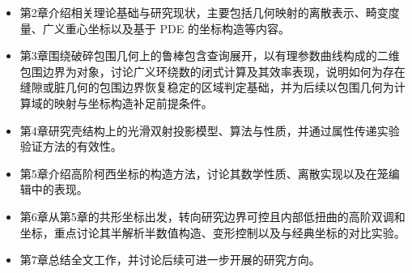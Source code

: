 \begin{itemize}
  \item 第2章介绍相关理论基础与研究现状，主要包括几何映射的离散表示、畸变度量、广义重心坐标以及基于 PDE 的坐标构造等内容。
  \item 第3章围绕破碎包围几何上的鲁棒包含查询展开，以有理参数曲线构成的二维包围边界为对象，讨论广义环绕数的闭式计算及其效率表现，说明如何为存在缝隙或脏几何的包围边界恢复稳定的区域判定基础，并为后续以包围几何为计算域的映射与坐标构造补足前提条件。
  \item 第4章研究壳结构上的光滑双射投影模型、算法与性质，并通过属性传递实验验证方法的有效性。
  \item 第5章介绍高阶柯西坐标的构造方法，讨论其数学性质、离散实现以及在笼编辑中的表现。
  \item 第6章从第5章的共形坐标出发，转向研究边界可控且内部低扭曲的高阶双调和坐标，重点讨论其半解析半数值构造、变形控制以及与经典坐标的对比实验。
  \item 第7章总结全文工作，并讨论后续可进一步开展的研究方向。
\end{itemize}
